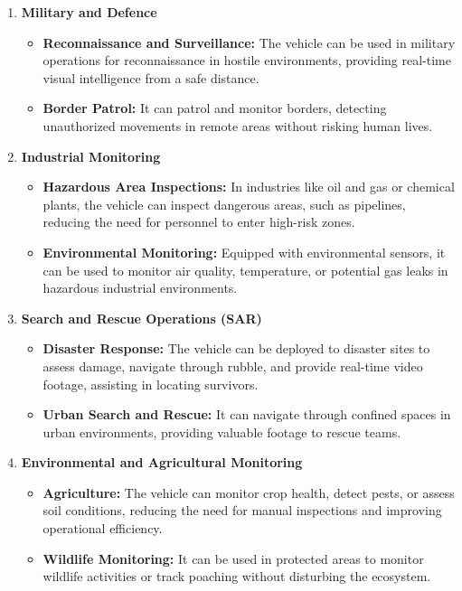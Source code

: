 \documentclass[12pt,a4paper]{report}
\begin{document}
\begin{enumerate}
    \item \textbf{Military and Defence}
    \begin{itemize}
        \item \textbf{Reconnaissance and Surveillance:} The vehicle can be used in military operations for reconnaissance in hostile environments, providing real-time visual intelligence from a safe distance.
        \item \textbf{Border Patrol:} It can patrol and monitor borders, detecting unauthorized movements in remote areas without risking human lives.
    \end{itemize}
    
    \item \textbf{Industrial Monitoring}
    \begin{itemize}
        \item \textbf{Hazardous Area Inspections:} In industries like oil and gas or chemical plants, the vehicle can inspect dangerous areas, such as pipelines, reducing the need for personnel to enter high-risk zones.
        \item \textbf{Environmental Monitoring:} Equipped with environmental sensors, it can be used to monitor air quality, temperature, or potential gas leaks in hazardous industrial environments.
    \end{itemize}
        
    \item \textbf{Search and Rescue Operations (SAR)}
    \begin{itemize}
        \item \textbf{Disaster Response:} The vehicle can be deployed to disaster sites to assess damage, navigate through rubble, and provide real-time video footage, assisting in locating survivors.
        \item \textbf{Urban Search and Rescue:} It can navigate through confined spaces in urban environments, providing valuable footage to rescue teams.
    \end{itemize}
    
    \item \textbf{Environmental and Agricultural Monitoring}
    \begin{itemize}
        \item \textbf{Agriculture:} The vehicle can monitor crop health, detect pests, or assess soil conditions, reducing the need for manual inspections and improving operational efficiency.
        \item \textbf{Wildlife Monitoring:} It can be used in protected areas to monitor wildlife activities or track poaching without disturbing the ecosystem.
    \end{itemize}
    

\end{enumerate}
\end{document}
